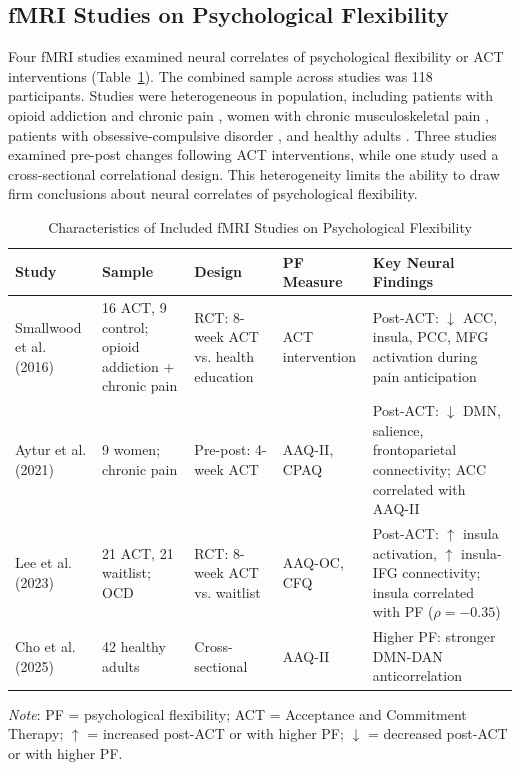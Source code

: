 \documentclass[12pt]{article}
\begin{document}
\subsection{fMRI Studies on Psychological Flexibility}

Four fMRI studies examined neural correlates of psychological flexibility or ACT interventions (Table~\ref{tab:fmri}). The combined sample across studies was 118 participants. Studies were heterogeneous in population, including patients with opioid addiction and chronic pain \citep{smallwood2016}, women with chronic musculoskeletal pain \citep{aytur2021}, patients with obsessive-compulsive disorder \citep{lee2023}, and healthy adults \citep{cho2025}. Three studies examined pre-post changes following ACT interventions, while one study used a cross-sectional correlational design. This heterogeneity limits the ability to draw firm conclusions about neural correlates of psychological flexibility.

\begin{table}[htbp]
\centering
\caption{Characteristics of Included fMRI Studies on Psychological Flexibility}
\label{tab:fmri}
\small
\begin{tabular}{p{2.5cm}p{3cm}p{2.5cm}p{1.5cm}p{4.5cm}}
\toprule
Study & Sample & Design & PF Measure & Key Neural Findings \\
\midrule
Smallwood et al. (2016) & 16 ACT, 9 control; opioid addiction + chronic pain & RCT: 8-week ACT vs. health education & ACT intervention & Post-ACT: $\downarrow$ ACC, insula, PCC, MFG activation during pain anticipation \\
Aytur et al. (2021) & 9 women; chronic pain & Pre-post: 4-week ACT & AAQ-II, CPAQ & Post-ACT: $\downarrow$ DMN, salience, frontoparietal connectivity; ACC correlated with AAQ-II \\
Lee et al. (2023) & 21 ACT, 21 waitlist; OCD & RCT: 8-week ACT vs. waitlist & AAQ-OC, CFQ & Post-ACT: $\uparrow$ insula activation, $\uparrow$ insula-IFG connectivity; insula correlated with PF ($\rho = -0.35$) \\
Cho et al. (2025) & 42 healthy adults & Cross-sectional & AAQ-II & Higher PF: stronger DMN-DAN anticorrelation \\
\bottomrule
\end{tabular}

\vspace{0.5em}
\footnotesize\textit{Note}: PF = psychological flexibility; ACT = Acceptance and Commitment Therapy; $\uparrow$ = increased post-ACT or with higher PF; $\downarrow$ = decreased post-ACT or with higher PF.
\end{table}
\end{document}
